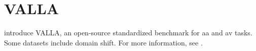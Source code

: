 \section{VALLA}
\label{sec:valla}

\citet{tyo_state_2022} introduce VALLA, an open-source standardized benchmark for \ac{aa} and \ac{av} tasks.
Some datasets include domain shift.
For more information, see \cite{tyo_state_2022}.